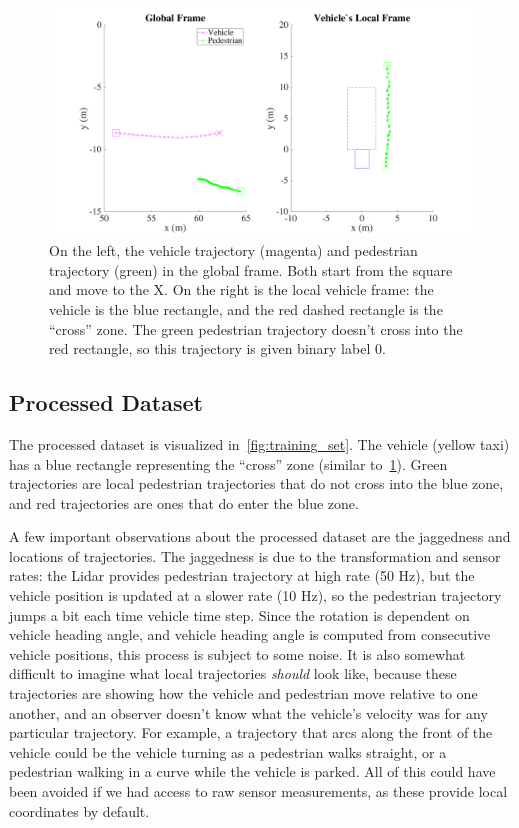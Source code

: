 \begin{figure}
	\centering
	\includegraphics [trim=0 0 0 0, clip, angle=0, width=0.8\columnwidth,
	keepaspectratio]{figures/global_to_local}
	\caption{On the left, the vehicle trajectory (magenta) and pedestrian trajectory (green) in the global frame. Both start from the square and move to the X. On the right is the local vehicle frame: the vehicle is the blue rectangle, and the red dashed rectangle is the ``cross'' zone. The green pedestrian trajectory doesn't cross into the red rectangle, so this trajectory is given binary label 0.} 
	\label{fig:global_to_local_matlab} 
\end{figure}

\subsection{Processed Dataset}

The processed dataset is visualized in~\cref{fig:training_set}.
The vehicle (yellow taxi) has a blue rectangle representing the ``cross'' zone (similar to~\cref{fig:global_to_local_matlab}).
Green trajectories are local pedestrian trajectories that do not cross into the blue zone, and red trajectories are ones that do enter the blue zone.

A few important observations about the processed dataset are the jaggedness and locations of trajectories.
The jaggedness is due to the transformation and sensor rates: the Lidar provides pedestrian trajectory at high rate (50 Hz), but the vehicle position is updated at a slower rate (10 Hz), so the pedestrian trajectory jumps a bit each time vehicle time step.
Since the rotation is dependent on vehicle heading angle, and vehicle heading angle is computed from consecutive vehicle positions, this process is subject to some noise.
It is also somewhat difficult to imagine what local trajectories \textit{should} look like, because these trajectories are showing how the vehicle and pedestrian move relative to one another, and an observer doesn't know what the vehicle's velocity was for any particular trajectory.
For example, a trajectory that arcs along the front of the vehicle could be the vehicle turning as a pedestrian walks straight, or a pedestrian walking in a curve while the vehicle is parked.
All of this could have been avoided if we had access to raw sensor measurements, as these provide local coordinates by default.

